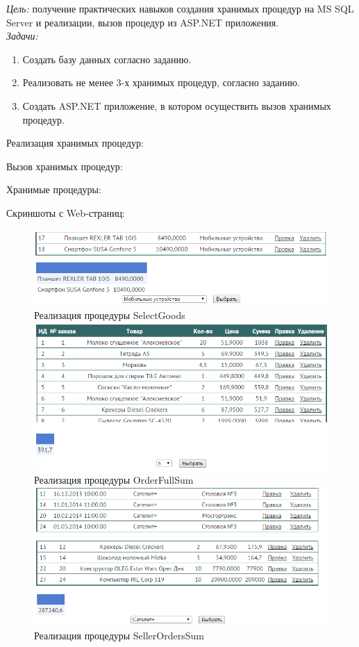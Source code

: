\documentclass[pscyr]{hedlab}
\begin{document}
    \makeheader
    \emph{Цель:} получение практических навыков создания хранимых процедур на
      MS SQL Server и реализации, вызов процедур из ASP.NET приложения.\\
    \emph{Задачи:} 
    \begin{enumerate}
        \item Создать базу данных согласно заданию.
        \item Реализовать не менее 3-х хранимых процедур, согласно заданию.
        \item Создать ASP.NET приложение, в котором осуществить вызов хранимых процедур.
    \end{enumerate}
    Реализация хранимых процедур:
    
    Вызов хранимых процедур:
    
    Хранимые процедуры:
    
    
    \pagebreak

    Скриншоты с Web-страниц:
    \begin{figure}[h!]
        \center
        \includegraphics[width=.8\textwidth]{good_group} \\
        Реализация процедуры SelectGoods \\
        \includegraphics[width=.8\textwidth]{order_sum} \\
        Реализация процедуры OrderFullSum \\
        \includegraphics[width=.8\textwidth]{seller_sum} \\
        Реализация процедуры SellerOrdersSum
    \end{figure}
\end{document}

